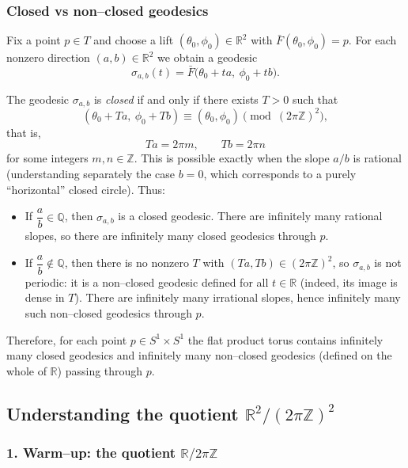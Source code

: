 \documentclass[12pt,a4paper]{article}
\theoremstyle{plain}
\theoremstyle{definition}      %
\begin{document}
\subsubsection*{Closed vs non--closed geodesics}

Fix a point $p\in T$ and choose a lift $(\theta_{0},\phi_{0})\in\mathbb{R}^{2}$
with $\bar F(\theta_{0},\phi_{0})=p$.  For each nonzero direction
$(a,b)\in\mathbb{R}^{2}$ we obtain a geodesic
\[
\sigma_{a,b}(t) = \bar F\bigl(\theta_{0}+ta,\ \phi_{0}+tb\bigr).
\]

The geodesic $\sigma_{a,b}$ is \emph{closed} if and only if there exists
$T>0$ such that
\[
(\theta_{0}+Ta,\ \phi_{0}+Tb)
\equiv
(\theta_{0},\phi_{0})
\pmod{(2\pi\mathbb{Z})^{2}},
\]
that is,
\[
Ta = 2\pi m,\qquad
Tb = 2\pi n
\]
for some integers $m,n\in\mathbb{Z}$.  This is possible exactly when the
slope $a/b$ is rational (understanding separately the case $b=0$, which
corresponds to a purely ``horizontal'' closed circle).  Thus:

\begin{itemize}
	\item If $\dfrac{a}{b}\in\mathbb{Q}$, then $\sigma_{a,b}$ is a closed
	geodesic.  There are infinitely many rational slopes, so there are
	infinitely many closed geodesics through $p$.
	\item If $\dfrac{a}{b}\notin\mathbb{Q}$, then there is no nonzero $T$
	with $(Ta,Tb)\in (2\pi\mathbb{Z})^{2}$, so $\sigma_{a,b}$ is not
	periodic: it is a non--closed geodesic defined for all
	$t\in\mathbb{R}$ (indeed, its image is dense in $T$).  There are
	infinitely many irrational slopes, hence infinitely many such
	non--closed geodesics through $p$.
\end{itemize}

Therefore, for each point $p\in S^{1}\times S^{1}$ the flat product torus
contains infinitely many closed geodesics and infinitely many non--closed
geodesics (defined on the whole of $\mathbb{R}$) passing through $p$.


\subsection*{Understanding the quotient $\mathbb{R}^{2}/(2\pi\mathbb{Z})^{2}$}

\subsubsection*{1. Warm--up: the quotient $\mathbb{R}/2\pi\mathbb{Z}$}
\end{document}
